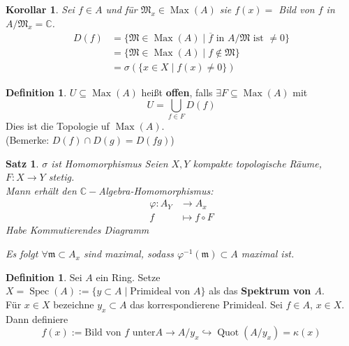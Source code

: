 \documentclass[10pt,a4paper]{article}
\newcommand{\C}{\ensuremath{\mathbb{C}}}
\newcommand{\ol}[1]{\overline{#1}}
\newcommand{\Quot}{\operatorname{Quot}}
\newcommand{\Spec}{\ensuremath{\operatorname{Spec}}}
\newcounter{thm}[section]
\theoremstyle{definition}
\newtheorem{definition}[thm]{Definition}
\theoremstyle{plain}
\newtheorem{kor}[thm]{Korollar}
\newtheorem{satz}[thm]{Satz}
\theoremstyle{remark}
\begin{document}
\begin{kor}
	Sei $f\in A$ und für $\mathfrak M_x\in\operatorname{Max}(A)$ sie $f(x)=$ Bild von $f$ in $A/\mathfrak M_x=\C$.
	\begin{align*}
		D(f)&=\{\mathfrak M\in \operatorname{Max}(A)\mid \text{$\ol{f}$ in $A/\mathfrak M$ ist $\neq 0$}\}\\
		&=\{\mathfrak M\in\operatorname{Max}(A)\mid f\notin\mathfrak M\}\\
		&=\sigma(\{x\in X\mid f(x)\neq 0\})
	\end{align*}
\end{kor}

\begin{definition}
	$U\subseteq\operatorname{Max}(A)$ heißt \textbf{offen}, falls $\exists F\subseteq\operatorname{Max}(A)$ mit
	\[U=\bigcup_{f\in F}D(f)\]
	Dies ist die Topologie uf $\operatorname{Max}(A)$.\\
	(Bemerke: $D(f)\cap D(g)=D(fg)$)
\end{definition}

\begin{satz}
	$\sigma$ ist Homomorphismus
	Seien $X,Y$ kompakte topologische Räume, $F:X\rightarrow Y$ stetig.\\
	Mann erhält den $\C-$Algebra-Homomorphismus:
	\begin{align*}
		\varphi:A_Y&\rightarrow A_x\\
		f&\mapsto f\circ F
	\end{align*}
	Habe Kommutierendes Diagramm
	\begin{center}
	\end{center}

	Es folgt $\forall \mathfrak m\subset A_x$ sind maximal, sodass $\varphi^{-1}(\mathfrak m)\subset A$ maximal ist.
\end{satz}

\setcounter{thm}{16}
\begin{definition}
	Sei $A$ ein Ring. Setze $X=\Spec(A):=\{y\subset A\mid\text{Primideal von $A$}\}$ als das \textbf{Spektrum von $A$}.\\
	Für $x\in X$ bezeichne $y_x\subset A$ das korrespondierene Primideal.
	Sei $f\in A$, $x\in X$. Dann definiere
	\[f(x):=\text{Bild von $f$ unter}A\rightarrow A/y_x\hookrightarrow\Quot(A/y_x)=\kappa(x)\]
\end{definition}
\end{document}

